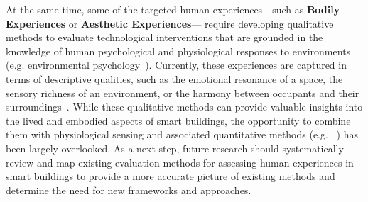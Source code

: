 At the same time, some of the targeted human experiences---such as \textbf{Bodily Experiences} or \textbf{Aesthetic Experiences}--- require developing qualitative methods to evaluate technological interventions that are grounded in the knowledge of human psychological and physiological responses to environments (e.g. environmental psychology~\cite{bower2019impact}). Currently, these experiences are captured in terms of descriptive qualities, such as the emotional resonance of a space, the sensory richness of an environment, or the harmony between occupants and their surroundings~\cite{schuricht2007freequent, diniz2008body}. While these qualitative methods can provide valuable insights into the lived and embodied aspects of smart buildings, the opportunity to combine them with physiological sensing and associated quantitative methods (e.g. ~\cite{moran2013using}) has been largely overlooked. As a next step, future research should systematically review and map existing evaluation methods for assessing human experiences in smart buildings to provide a more accurate picture of existing methods and determine the need for new frameworks and approaches. 

